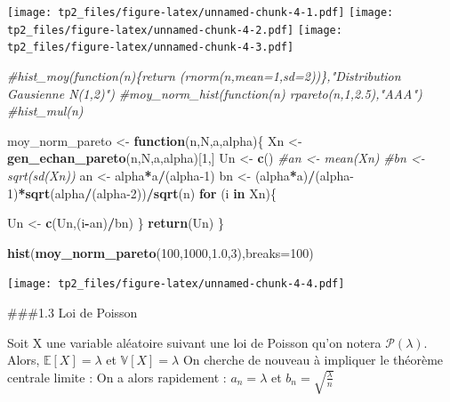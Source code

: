 \documentclass[]{article}
\newenvironment{Shaded}{\begin{snugshade}}{\end{snugshade}}
\newcommand{\CommentTok}[1]{\textcolor[rgb]{0.56,0.35,0.01}{\textit{#1}}}
\newcommand{\ControlFlowTok}[1]{\textcolor[rgb]{0.13,0.29,0.53}{\textbf{#1}}}
\newcommand{\DataTypeTok}[1]{\textcolor[rgb]{0.13,0.29,0.53}{#1}}
\newcommand{\DecValTok}[1]{\textcolor[rgb]{0.00,0.00,0.81}{#1}}
\newcommand{\FloatTok}[1]{\textcolor[rgb]{0.00,0.00,0.81}{#1}}
\newcommand{\KeywordTok}[1]{\textcolor[rgb]{0.13,0.29,0.53}{\textbf{#1}}}
\newcommand{\NormalTok}[1]{#1}
\newcommand{\OperatorTok}[1]{\textcolor[rgb]{0.81,0.36,0.00}{\textbf{#1}}}
\newcommand{\StringTok}[1]{\textcolor[rgb]{0.31,0.60,0.02}{#1}}
\begin{document}
\texttt{[image: tp2\_files/figure-latex/unnamed-chunk-4-1.pdf]}
\texttt{[image: tp2\_files/figure-latex/unnamed-chunk-4-2.pdf]}
\texttt{[image: tp2\_files/figure-latex/unnamed-chunk-4-3.pdf]}

\begin{Shaded}
\begin{Highlighting}[]
\CommentTok{#hist_moy(function(n)\{return (rnorm(n,mean=1,sd=2))\},"Distribution Gausienne N(1,2)")}
\CommentTok{#moy_norm_hist(function(n) rpareto(n,1,2.5),"AAA")}
\CommentTok{#hist_mul(n)}

\NormalTok{moy_norm_pareto <-}\StringTok{ }\ControlFlowTok{function}\NormalTok{(n,N,a,alpha)\{}
\NormalTok{  Xn <-}\StringTok{ }\KeywordTok{gen_echan_pareto}\NormalTok{(n,N,a,alpha)[}\DecValTok{1}\NormalTok{,]}
\NormalTok{  Un <-}\StringTok{ }\KeywordTok{c}\NormalTok{()}
  \CommentTok{#an <- mean(Xn) }
  \CommentTok{#bn <-sqrt(sd(Xn))}
\NormalTok{  an <-}\StringTok{ }\NormalTok{alpha}\OperatorTok{*}\NormalTok{a}\OperatorTok{/}\NormalTok{(alpha}\DecValTok{-1}\NormalTok{)}
\NormalTok{  bn <-}\StringTok{ }\NormalTok{(alpha}\OperatorTok{*}\NormalTok{a)}\OperatorTok{/}\NormalTok{(alpha}\DecValTok{-1}\NormalTok{)}\OperatorTok{*}\KeywordTok{sqrt}\NormalTok{(alpha}\OperatorTok{/}\NormalTok{(alpha}\DecValTok{-2}\NormalTok{))}\OperatorTok{/}\KeywordTok{sqrt}\NormalTok{(n)}
  \ControlFlowTok{for}\NormalTok{ (i }\ControlFlowTok{in}\NormalTok{ Xn)\{}
    
\NormalTok{    Un <-}\StringTok{ }\KeywordTok{c}\NormalTok{(Un,(i}\OperatorTok{-}\NormalTok{an)}\OperatorTok{/}\NormalTok{bn)}
\NormalTok{  \}}
  \KeywordTok{return}\NormalTok{(Un)}
\NormalTok{\}}

\KeywordTok{hist}\NormalTok{(}\KeywordTok{moy_norm_pareto}\NormalTok{(}\DecValTok{100}\NormalTok{,}\DecValTok{1000}\NormalTok{,}\FloatTok{1.0}\NormalTok{,}\DecValTok{3}\NormalTok{),}\DataTypeTok{breaks=}\DecValTok{100}\NormalTok{)}
\end{Highlighting}
\end{Shaded}

\texttt{[image: tp2\_files/figure-latex/unnamed-chunk-4-4.pdf]}

\#\#\#1.3 Loi de Poisson

Soit X une variable aléatoire suivant une loi de Poisson qu'on notera
\(\mathcal{P}(\lambda)\). Alors, \(\mathbb{E}[X]=\lambda\) et
\(\mathbb{V}[X]=\lambda\) On cherche de nouveau à impliquer le théorème
centrale limite : On a alors rapidement : \(a_n=\lambda\) et
\(b_n=\sqrt{\frac{\lambda}{n}}\)
\end{document}
